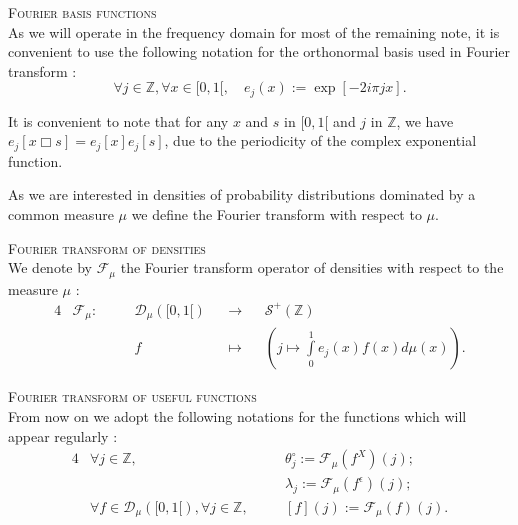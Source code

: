 \begin{nota}{\textsc{Fourier basis functions}\\}\label{nota1.4.1}
As we will operate in the frequency domain for most of the remaining note, it is convenient to use the following notation for the orthonormal basis used in Fourier transform :
\[\forall j \in \mathds{Z}, \forall x \in [0, 1[, \quad e_{j}(x) := \exp[- 2 i \pi j x].\]
\end{nota}

\begin{rmk}\label{rmk1.4.1}
It is convenient to note that for any $x$ and $s$ in $[0, 1[$ and $j$ in $\mathds{Z}$, we have $e_{j}[x \Box s] = e_{j}[x]e_{j}[s]$, due to the periodicity of the complex exponential function.
\end{rmk}

As we are interested in densities of probability distributions dominated by a common measure $\mu$ we define the Fourier transform with respect to $\mu$.

\begin{de}{\textsc{Fourier transform of densities}\\}\label{de1.4.3}
We denote by $\mathcal{F}_{\mu}$ the Fourier transform operator of densities with respect to the measure $\mu$ :
\begin{alignat*}{4}
&\mathcal{F}_{\mu} : \quad && \mathcal{D}_{\mu}([0,1[) &&\rightarrow&& \mathcal{S}^{+}(\mathds{Z})\\
& && f && \mapsto && \left(j \mapsto \int\limits_{0}^{1} e_{j}(x) f(x) d\mu(x)\right).
\end{alignat*}
\end{de}

\begin{nota}{\textsc{Fourier transform of useful functions}\\}\label{nota1.4.2}
From now on we adopt the following notations for the functions which will appear regularly :
\begin{alignat*}{4}
&\forall j \in \mathds{Z}, && \theta^{\circ}_{j} := \mathcal{F}_{\mu}(f^{X})(j);\\
& && \lambda_{j} := \mathcal{F}_{\mu}(f^{\epsilon})(j);\\
&\forall f \in \mathcal{D}_{\mu}([0, 1[), \forall j \in \mathds{Z}, \quad && [f](j) := \mathcal{F}_{\mu}(f)(j).\\
\end{alignat*}
\end{nota}

